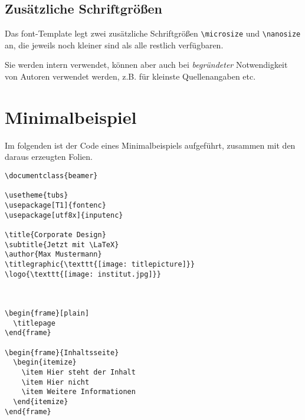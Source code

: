 \subsection{Zusätzliche Schriftgrößen}

Das font-Template legt zwei zusätzliche Schriftgrößen \lstinline{\microsize}
und \lstinline{\nanosize} an, die jeweils noch kleiner sind als alle restlich
verfügbaren.

Sie werden intern verwendet, können aber auch bei \emph{begründeter}
Notwendigkeit von Autoren verwendet werden, z.B. für kleinste Quellenangaben
etc.


\section{Minimalbeispiel}%

Im folgenden ist der Code eines Minimalbeispiels aufgeführt, zusammen mit den
daraus erzeugten Folien.

\begin{verbatim}
\documentclass{beamer}

\usetheme{tubs}
\usepackage[T1]{fontenc}
\usepackage[utf8x]{inputenc}

\title{Corporate Design}
\subtitle{Jetzt mit \LaTeX}
\author{Max Mustermann}
\titlegraphic{\texttt{[image: titlepicture]}}
\logo{\texttt{[image: institut.jpg]}}



\begin{frame}[plain]
  \titlepage
\end{frame}

\begin{frame}{Inhaltsseite}
  \begin{itemize}
    \item Hier steht der Inhalt
    \item Hier nicht
    \item Weitere Informationen
  \end{itemize}
\end{frame}


\end{verbatim}

\begin{center}

\end{center}
